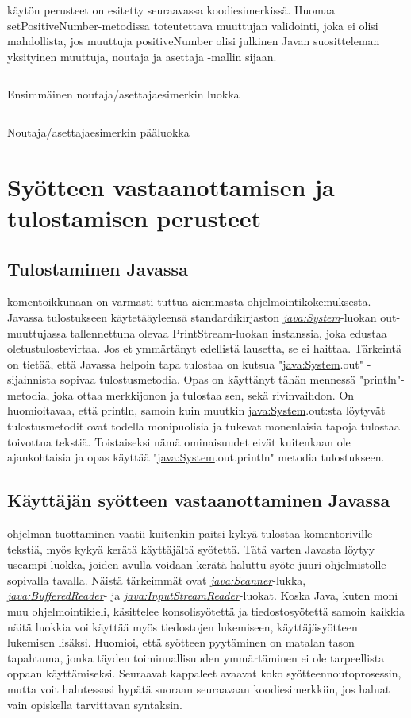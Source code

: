 \documentclass{tufte-book}
\newcommand{\java}[1]{\underline{\gls{java:#1}}}
\newcommand{\newjava}[1]{\textit{\java{#1}}}
\newcommand{\code}[3]{
\begin{listing}
    \inputminted{java}{OhjelmointiopasEsimerkit/src/#1/#2.java}
    \caption{#3}
    \label{Java-#1-#2}
\end{listing}
}
\begin{document}
 käytön perusteet on esitetty seuraavassa koodiesimerkissä.
Huomaa setPositiveNumber-metodissa toteutettava muuttujan validointi, joka ei olisi mahdollista,
jos muuttuja positiveNumber olisi julkinen Javan suositteleman yksityinen muuttuja, noutaja ja
asettaja -mallin sijaan.

\code{week2}{GetterSetterChild}{Ensimmäinen noutaja/asettajaesimerkin luokka}
\code{week2}{GetterSetterMain}{Noutaja/asettajaesimerkin pääluokka}

\section{Syötteen vastaanottamisen ja tulostamisen perusteet}

\subsection{Tulostaminen Javassa}

 komentoikkunaan on varmasti tuttua aiemmasta
ohjelmointikokemuksesta. Javassa tulostukseen käytetääyleensä standardikirjaston 
\newjava{System}-luokan out-muuttujassa tallennettuna olevaa PrintStream-luokan instanssia, joka
edustaa oletustulostevirtaa. Jos et ymmärtänyt edellistä lausetta, se ei haittaa. Tärkeintä on
tietää, että Javassa helpoin tapa tulostaa on kutsua "\java{System}.out" - sijainnista sopivaa
tulostusmetodia. Opas on käyttänyt tähän mennessä "println"-metodia, joka ottaa merkkijonon ja
tulostaa sen, sekä rivinvaihdon. On huomioitavaa, että println, samoin kuin muutkin
\java{System}.out:sta löytyvät tulostusmetodit ovat todella monipuolisia ja tukevat monenlaisia
tapoja tulostaa toivottua tekstiä. Toistaiseksi nämä ominaisuudet eivät kuitenkaan ole
ajankohtaisia ja opas käyttää "\java{System}.out.println" metodia tulostukseen.

\subsection{Käyttäjän syötteen vastaanottaminen Javassa}

 ohjelman tuottaminen vaatii kuitenkin paitsi kykyä tulostaa
komentoriville tekstiä, myös kykyä kerätä käyttäjältä syötettä. Tätä varten Javasta löytyy
useampi luokka, joiden avulla voidaan kerätä haluttu syöte juuri ohjelmistolle sopivalla tavalla.
Näistä tärkeimmät ovat \newjava{Scanner}-lukka, \newjava{BufferedReader}- ja
\newjava{InputStreamReader}-luokat. Koska Java, kuten moni muu ohjelmointikieli, käsittelee
konsolisyötettä ja tiedostosyötettä samoin kaikkia näitä luokkia voi käyttää myös tiedostojen
lukemiseen, käyttäjäsyötteen lukemisen lisäksi. Huomioi, että syötteen pyytäminen on matalan
tason tapahtuma, jonka täyden toiminnallisuuden ymmärtäminen ei ole tarpeellista oppaan
käyttämiseksi. Seuraavat kappaleet avaavat koko syötteennoutoprosessin, mutta voit halutessasi
hypätä suoraan seuraavaan koodiesimerkkiin, jos haluat vain opiskella tarvittavan syntaksin.
\end{document}
